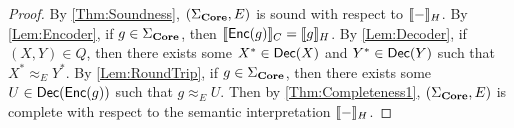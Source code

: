 \begin{proof}
    By \cref{Thm:Soundness}, $( \Sigma_{\mathbf{Core}}, E )$ is sound with respect to $\llbracket-\rrbracket_H$.
    By \cref{Lem:Encoder}, if $g \in \Sigma_{\mathbf{Core}}$, then $\llbracket\mathsf{Enc}(g)\rrbracket_C = \llbracket g\rrbracket_H$.
    By \cref{Lem:Decoder}, if $( X, Y ) \in Q$, then there exists some $X^* \in \mathsf{Dec}( X )$ and $Y^* \in \mathsf{Dec}( Y )$ such that $X^* \approx_E Y^*$.
    By \cref{Lem:RoundTrip}, if $g \in \Sigma_{\mathbf{Core}}$, then there exists some $U \in \mathsf{Dec}( \mathsf{Enc}( g ) )$ such that $g \approx_E U$.
    Then by \cref{Thm:Completeness1}, $( \Sigma_{\mathbf{Core}}, E )$ is complete with respect to the semantic interpretation $\llbracket-\rrbracket_H$.
\end{proof}